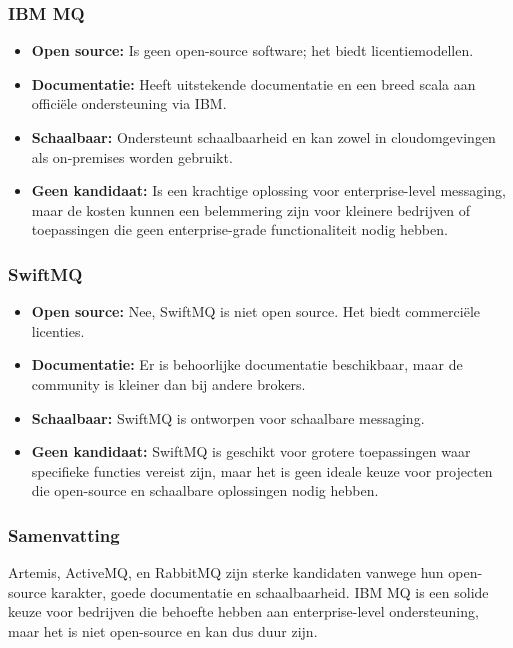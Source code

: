 \subsubsection{IBM MQ}
\begin{itemize}
    \item \textbf{Open source:} Is geen open-source software; het biedt licentiemodellen.
    \item \textbf{Documentatie:} Heeft uitstekende documentatie en een breed scala aan officiële ondersteuning via IBM.
    \item \textbf{Schaalbaar:} Ondersteunt schaalbaarheid en kan zowel in cloudomgevingen als on-premises worden gebruikt.
    \item \textbf{Geen kandidaat:} Is een krachtige oplossing voor enterprise-level messaging, maar de kosten kunnen een belemmering zijn voor kleinere bedrijven of toepassingen die geen enterprise-grade functionaliteit nodig hebben.
\end{itemize}

\subsubsection{SwiftMQ}
\begin{itemize}
    \item \textbf{Open source:} Nee, SwiftMQ is niet open source. Het biedt commerciële licenties.
    \item \textbf{Documentatie:} Er is behoorlijke documentatie beschikbaar, maar de community is kleiner dan bij andere brokers.
    \item \textbf{Schaalbaar:} SwiftMQ is ontworpen voor schaalbare messaging.
    \item \textbf{Geen kandidaat:} SwiftMQ is geschikt voor grotere toepassingen waar specifieke functies vereist zijn, maar het is geen ideale keuze voor projecten die open-source en schaalbare oplossingen nodig hebben.
\end{itemize}

\subsubsection{Samenvatting}
Artemis, ActiveMQ, en RabbitMQ zijn sterke kandidaten vanwege hun open-source karakter, goede documentatie en schaalbaarheid.
IBM MQ is een solide keuze voor bedrijven die behoefte hebben aan enterprise-level ondersteuning, maar het is niet open-source en kan dus duur zijn.

